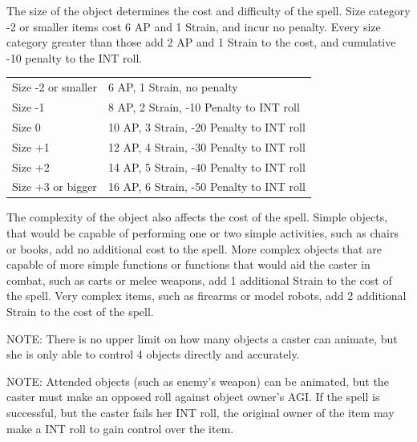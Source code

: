 \documentclass[11pt,a4paper,twocolumn]{book}
\begin{document}
The size of the object determines the cost and difficulty of the spell. Size category -2 or smaller items cost 6 AP and 1 Strain, and incur no penalty. Every size category greater than those add 2 AP and 1 Strain to the cost, and cumulative -10 penalty to the INT roll.

\medskip

{
	\begin{tabu} to 75mm{| X[l,4] | X[l,7] |}
		\hline
		Size -2 or smaller		&  	6 AP, 1 Strain, no penalty\\
        Size -1	      			&  	8 AP, 2 Strain, -10 Penalty to INT roll			\\
        Size 0     				&  	10 AP, 3 Strain, -20 Penalty to INT roll		\\
        Size +1     			&  	12 AP, 4 Strain, -30 Penalty to INT roll		\\
        Size +2      			&  	14 AP, 5 Strain, -40 Penalty to INT roll		\\
        Size +3 or bigger  		&  	16 AP, 6 Strain, -50 Penalty to INT roll 		\\ \hline
	\end{tabu}
		
}

\medskip

The complexity of the object also affects the cost of the spell. Simple objects, that would be capable of performing one or two simple activities, such as chairs or books, add no additional cost to the spell. More complex objects that are capable of more simple functions or functions that would aid the caster in combat, such as carts or melee weapons, add 1 additional Strain to the cost of the spell. Very complex items, such as firearms or model robots, add 2 additional Strain to the cost of the spell.

NOTE: There is no upper limit on how many objects a caster can animate, but she is only able to control 4 objects directly and accurately.

NOTE: Attended objects (such as enemy's weapon) can be animated, but the caster must make an opposed roll against object owner's AGI. If the spell is successful, but the caster fails her INT roll, the original owner of the item may make a INT roll to gain control over the item.
\end{document}
